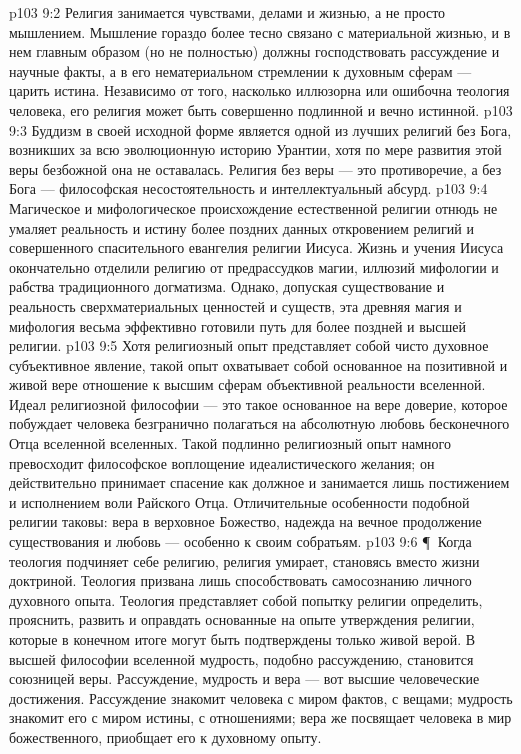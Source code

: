 \vs p103 9:2 Религия занимается чувствами, делами и жизнью, а не просто мышлением. Мышление гораздо более тесно связано с материальной жизнью, и в нем главным образом (но не полностью) должны господствовать рассуждение и научные факты, а в его нематериальном стремлении к духовным сферам --- царить истина. Независимо от того, насколько иллюзорна или ошибочна теология человека, его религия может быть совершенно подлинной и вечно истинной.
\vs p103 9:3 Буддизм в своей исходной форме является одной из лучших религий без Бога, возникших за всю эволюционную историю Урантии, хотя по мере развития этой веры безбожной она не оставалась. Религия без веры --- это противоречие, а без Бога --- философская несостоятельность и интеллектуальный абсурд.
\vs p103 9:4 Магическое и мифологическое происхождение естественной религии отнюдь не умаляет реальность и истину более поздних данных откровением религий и совершенного спасительного евангелия религии Иисуса. Жизнь и учения Иисуса окончательно отделили религию от предрассудков магии, иллюзий мифологии и рабства традиционного догматизма. Однако, допуская существование и реальность сверхматериальных ценностей и существ, эта древняя магия и мифология весьма эффективно готовили путь для более поздней и высшей религии.
\vs p103 9:5 Хотя религиозный опыт представляет собой чисто духовное субъективное явление, такой опыт охватывает собой основанное на позитивной и живой вере отношение к высшим сферам объективной реальности вселенной. Идеал религиозной философии --- это такое основанное на вере доверие, которое побуждает человека безгранично полагаться на абсолютную любовь бесконечного Отца вселенной вселенных. Такой подлинно религиозный опыт намного превосходит философское воплощение идеалистического желания; он действительно принимает спасение как должное и занимается лишь постижением и исполнением воли Райского Отца. Отличительные особенности подобной религии таковы: вера в верховное Божество, надежда на вечное продолжение существования и любовь --- особенно к своим собратьям.
\vs p103 9:6 \P\ Когда теология подчиняет себе религию, религия умирает, становясь вместо жизни доктриной. Теология призвана лишь способствовать самосознанию личного духовного опыта. Теология представляет собой попытку религии определить, прояснить, развить и оправдать основанные на опыте утверждения религии, которые в конечном итоге могут быть подтверждены только живой верой. В высшей философии вселенной мудрость, подобно рассуждению, становится союзницей веры. Рассуждение, мудрость и вера --- вот высшие человеческие достижения. Рассуждение знакомит человека с миром фактов, с вещами; мудрость знакомит его с миром истины, с отношениями; вера же посвящает человека в мир божественного, приобщает его к духовному опыту.
